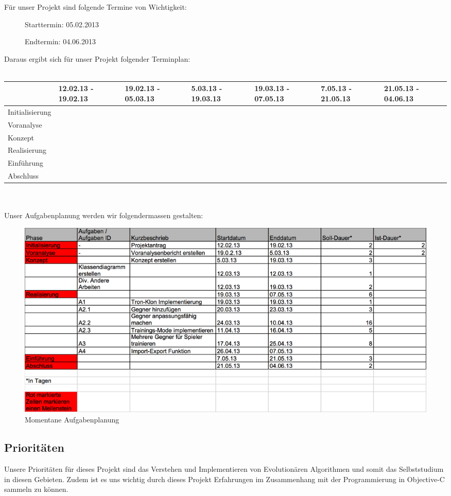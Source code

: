 	Für unser Projekt sind folgende Termine von Wichtigkeit:
	\begin{description}
		\item[] Starttermin: 05.02.2013
		\item[] Endtermin: 04.06.2013
	\end{description}
	Daraus ergibt sich für unser Projekt folgender Terminplan:
	\\ \\
	\tiny{
	\begin{tabular}{| p{2cm} | p{1cm} | p{1cm} | p{1cm} | p{1cm} | p{1cm} | p{1cm} |}
	\hline
	\rowcolor[gray]{0.9}  & 12.02.13 - 19.02.13 & 19.02.13 - 05.03.13 & 5.03.13 - 19.03.13 & 19.03.13 - 07.05.13 & 7.05.13 - 21.05.13 & 21.05.13 - 04.06.13 \\
	\hline
	Initialisierung & \cellcolor{yellow} & & & & & \\
	\hline
	Voranalyse & &  \cellcolor{yellow}& & & & \\
	\hline
	Konzept & & &  \cellcolor{yellow}& & & \\
	\hline
	Realisierung & & & &  \cellcolor{yellow}& & \\
	\hline
	Einführung & & & & & \cellcolor{yellow}& \\
	\hline
	Abschluss & & & & &  &\cellcolor{yellow} \\
	\hline
	\end{tabular}	
	}
	\small{
	\\ \\
	Unser Aufgabenplanung werden wir folgendermassen gestalten: 

	\begin{figure}[htb]

	\centering

	\includegraphics[width=\textwidth]{plan.png}

	\caption{Momentane Aufgabenplanung}

	\end{figure}

	\subsection{Prioritäten}
	Unsere Prioritäten für dieses Projekt sind das Verstehen und Implementieren von Evolutionären Algorithmen und somit das Selbststudium in diesen Gebieten. Zudem ist es uns wichtig durch dieses Projekt Erfahrungen im Zusammenhang mit der Programmierung in Objective-C sammeln zu können. 
}